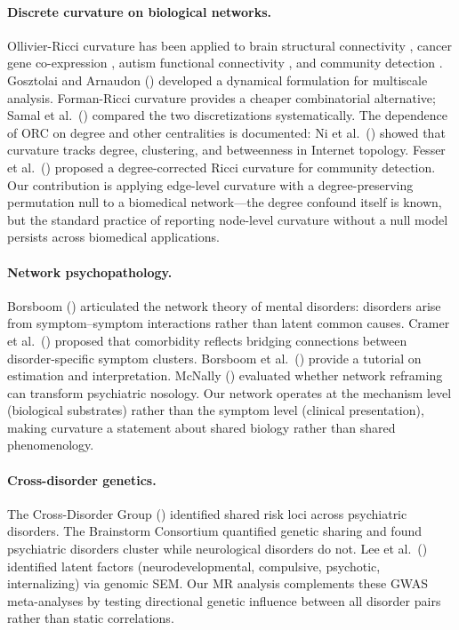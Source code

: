 \documentclass{article}
\begin{document}
\paragraph{Discrete curvature on biological networks.} Ollivier-Ricci curvature has been applied to brain structural connectivity \citep{farooq2019network}, cancer gene co-expression \citep{sandhu2015graph}, autism functional connectivity \citep{simhal2020measuring, elumalai2022graph}, and community detection \citep{ni2019community, sia2019ollivier}. Gosztolai and Arnaudon (\citeyear{gosztolai2021unfolding}) developed a dynamical formulation for multiscale analysis. Forman-Ricci curvature \citep{sreejith2016forman} provides a cheaper combinatorial alternative; Samal et al.\ (\citeyear{samal2018comparative}) compared the two discretizations systematically. The dependence of ORC on degree and other centralities is documented: Ni et al.\ (\citeyear{ni2015ricci}) showed that curvature tracks degree, clustering, and betweenness in Internet topology. Fesser et al.\ (\citeyear{fesser2024degreecorrected}) proposed a degree-corrected Ricci curvature for community detection. Our contribution is applying edge-level curvature with a degree-preserving permutation null to a biomedical network---the degree confound itself is known, but the standard practice of reporting node-level curvature without a null model persists across biomedical applications.

\paragraph{Network psychopathology.} Borsboom (\citeyear{borsboom2017network}) articulated the network theory of mental disorders: disorders arise from symptom--symptom interactions rather than latent common causes. Cramer et al.\ (\citeyear{cramer2010comorbidity}) proposed that comorbidity reflects bridging connections between disorder-specific symptom clusters. Borsboom et al.\ (\citeyear{borsboom2021network}) provide a tutorial on estimation and interpretation. McNally (\citeyear{mcnally2016can}) evaluated whether network reframing can transform psychiatric nosology. Our network operates at the mechanism level (biological substrates) rather than the symptom level (clinical presentation), making curvature a statement about shared biology rather than shared phenomenology.

\paragraph{Cross-disorder genetics.} The Cross-Disorder Group (\citeyear{crossdisorder2013identification, crossdisorder2019genomic}) identified shared risk loci across psychiatric disorders. The Brainstorm Consortium \citep{anttila2018analysis} quantified genetic sharing and found psychiatric disorders cluster while neurological disorders do not. Lee et al.\ (\citeyear{lee2022genetic}) identified latent factors (neurodevelopmental, compulsive, psychotic, internalizing) via genomic SEM. Our MR analysis complements these GWAS meta-analyses by testing directional genetic influence between all disorder pairs rather than static correlations.
\end{document}
